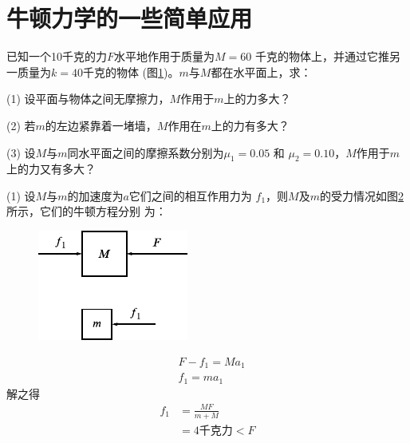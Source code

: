 \section{牛顿力学的一些简单应用}\label{sec:03.05}

\example 已知一个10千克的力$ F $水平地作用于质量为$ M = 6 0 $
千克的物体上，并通过它推另一质量为$ k = 4 0 $千克的物体
(图\ref{fig:03.08})。$ m $与$ M $都在水平面上，求：

(1) 设平面与物体之间无摩擦力，$ M $作用于$ m $上的力多大？

(2) 若$ m $的左边紧靠着一堵墙，$ M $作用在$ m $上的力有多大？

(3) 设$ M $与$ m $同水平面之间的摩擦系数分别为$ \mu _ { 1 } = 0 . 0 5 $ 和
$ \mu _ { 2 } = 0 . 1 0 $，$ M $作用于$ m $上的力又有多大？
\begin{figure}[!h]
  \centering
  \caption{}
  \label{fig:03.08}
\end{figure}

\solution (1) 设$ M $与$ m $的加速度为$ a $它们之间的相互作用力为
$f_1$，则$ M $及$ m $的受力情况如图\ref{fig:03.09} 所示，它们的牛顿方程分别
为：
\begin{figure}
  \centering
  \includegraphics{figure/fig03.09}
  \caption{}
  \label{fig:03.09}
\end{figure}
\vspace{-1.4em}
\begin{align*}
   & F - f _ { 1 } = M a _ { 1 } \\
   & f _ { 1 } = m a _ { 1 }
\end{align*}
解之得
\begin{align*}
  f _ { 1 } & = \frac { M F } { m + M } \\
            & =4\text{千克力} < F
\end{align*}

